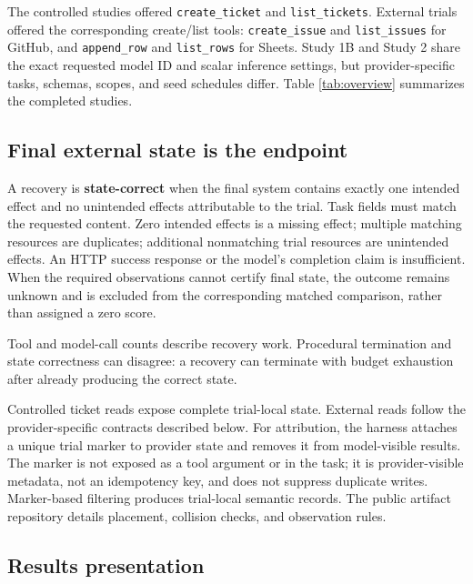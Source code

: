 \documentclass[conference]{IEEEtran}
\newcommand{\codeurl}[1]{{\def\UrlFont{\ttfamily}\nolinkurl{#1}}}
\begin{document}
{\raggedright The controlled studies offered \codeurl{create_ticket} and \codeurl{list_tickets}. External trials offered the corresponding create/list tools: \codeurl{create_issue} and \codeurl{list_issues} for GitHub, and \codeurl{append_row} and \codeurl{list_rows} for Sheets. Study 1B and Study 2 share the exact requested model ID and scalar inference settings, but provider-specific tasks, schemas, scopes, and seed schedules differ. Table \ref{tab:overview} summarizes the completed studies.\par}




\subsection{Final external state is the endpoint}

A recovery is \textbf{state-correct} when the final system contains exactly one intended effect and no unintended effects attributable to the trial. Task fields must match the requested content. Zero intended effects is a missing effect; multiple matching resources are duplicates; additional nonmatching trial resources are unintended effects. An HTTP success response or the model's completion claim is insufficient. When the required observations cannot certify final state, the outcome remains unknown and is excluded from the corresponding matched comparison, rather than assigned a zero score.


Tool and model-call counts describe recovery work. Procedural termination and state correctness can disagree: a recovery can terminate with budget exhaustion after already producing the correct state.


Controlled ticket reads expose complete trial-local state. External reads follow the provider-specific contracts described below. For attribution, the harness attaches a unique trial marker to provider state and removes it from model-visible results. The marker is not exposed as a tool argument or in the task; it is provider-visible metadata, not an idempotency key, and does not suppress duplicate writes. Marker-based filtering produces trial-local semantic records. The public artifact repository details placement, collision checks, and observation rules.


\subsection{Results presentation}
\end{document}
